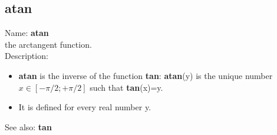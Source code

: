 \subsection{ atan }
\noindent Name: \textbf{atan}\\
the arctangent function.\\

\noindent Description: \begin{itemize}

\item \textbf{atan} is the inverse of the function \textbf{tan}: \textbf{atan}(y) is the unique number 
   $x \in [-\pi/2; +\pi/2]$ such that \textbf{tan}(x)=y.

\item It is defined for every real number y.
\end{itemize}
See also: \textbf{tan}

